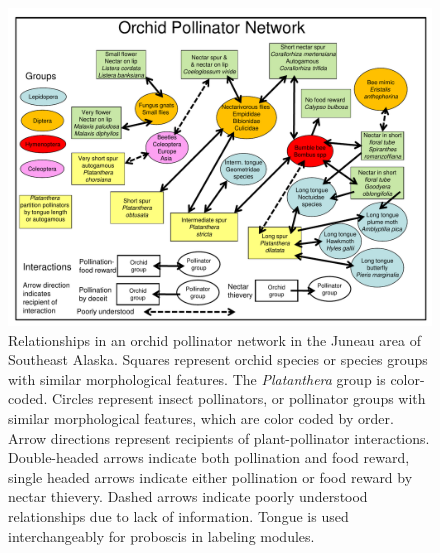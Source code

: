 \begin{figure}[H]
\begin{center}
\vspace{2mm}
\includegraphics[width=\textwidth]{img/pollinator_network.pdf}
\caption{Relationships in an orchid pollinator network in the Juneau area of Southeast Alaska.  Squares represent orchid species or species groups with similar morphological features.  The \emph{Platanthera} group is color-coded. Circles represent insect pollinators, or pollinator groups with similar morphological features, which are color coded by order.  Arrow directions represent recipients of plant-pollinator interactions.  Double-headed arrows indicate both pollination and food reward, single headed arrows indicate either pollination or food reward by nectar thievery.  Dashed arrows indicate poorly understood relationships due to lack of information.  Tongue is used interchangeably for proboscis in labeling modules.}
\label{pollinator_network}
\end{center}
\end{figure} 
